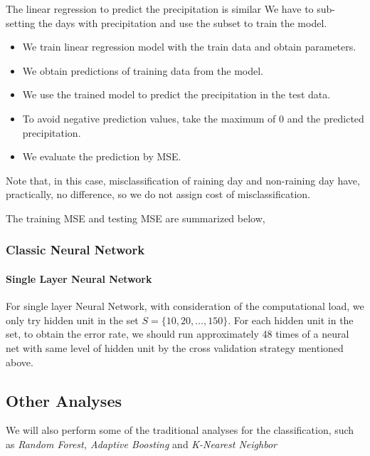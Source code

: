 \documentclass[a4paper,11pt]{article}
\newcommand{\set}[1]{\lbrace #1 \rbrace}
\begin{document}
The linear regression to predict the precipitation is similar We have to sub-setting the days with precipitation and use the subset to train the model.

\begin{itemize}
	\item We train linear regression model with the train data and obtain parameters.
	\item We obtain predictions of training data from the model.
	\item We use the trained model to predict the precipitation in the test data.
	\item To avoid negative prediction values, take the maximum of 0 and the predicted precipitation.
	\item We evaluate the prediction by MSE.
\end{itemize}
Note that, in this case, misclassification of raining day and non-raining day have, practically, no difference, so we do not assign cost of misclassification. 

The training MSE and testing MSE are summarized below,

\subsubsection{Classic Neural Network}

\paragraph{Single Layer Neural Network} For single layer Neural Network, with consideration of the computational load, we only try hidden unit in the set $S = \set{10,20,\ldots,150}$. For each hidden unit in the set, to obtain the error rate, we should run approximately 48 times of a neural net with same level of hidden unit by the cross validation strategy mentioned above.



\subsection{Other Analyses}
We will also perform some of the traditional analyses for the classification, such as \emph{Random Forest, Adaptive Boosting} and \emph{K-Nearest Neighbor} 

\newpage
\end{document}
